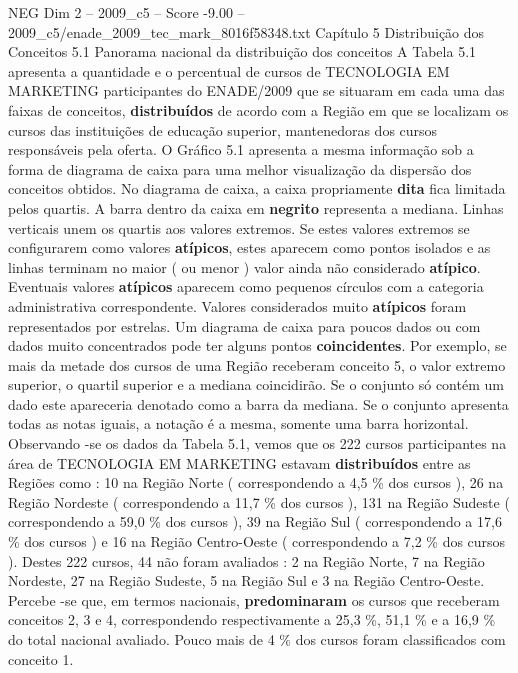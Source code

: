 \begin{textsample}{NEG Dim 2 – 2009\_c5 – Score -9.00 – 2009\_c5/enade\_2009\_tec\_mark\_8016f58348.txt}  \label{ex:f2_neg_001}
Capítulo 5 Distribuição dos Conceitos 5.1 Panorama nacional da distribuição dos conceitos A Tabela 5.1 apresenta a quantidade e o percentual de cursos de TECNOLOGIA EM MARKETING participantes do ENADE/2009 que se situaram em cada uma das faixas de conceitos, \textbf{distribuídos} de acordo com a Região em que se localizam os cursos das instituições de educação superior, mantenedoras dos cursos responsáveis pela oferta.
O Gráfico 5.1 apresenta a mesma informação sob a forma de diagrama de caixa para uma melhor visualização da dispersão dos conceitos obtidos.
No diagrama de caixa, a caixa propriamente \textbf{dita} fica limitada pelos quartis.
A barra dentro da caixa em \textbf{negrito} representa a mediana.
Linhas verticais unem os quartis aos valores extremos.
Se estes valores extremos se configurarem como valores \textbf{atípicos}, estes aparecem como pontos isolados e as linhas terminam no maior ( ou menor ) valor ainda não considerado \textbf{atípico}.
Eventuais valores \textbf{atípicos} aparecem como pequenos círculos com a categoria administrativa correspondente.
Valores considerados muito \textbf{atípicos} foram representados por estrelas.
Um diagrama de caixa para poucos dados ou com dados muito concentrados pode ter alguns pontos \textbf{coincidentes}.
Por exemplo, se mais da metade dos cursos de uma Região receberam conceito 5, o valor extremo superior, o quartil superior e a mediana coincidirão.
Se o conjunto só contém um dado este apareceria denotado como a barra da mediana.
Se o conjunto apresenta todas as notas iguais, a notação é a mesma, somente uma barra horizontal.
Observando -se os dados da Tabela 5.1, vemos que os 222 cursos participantes na área de TECNOLOGIA EM MARKETING estavam \textbf{distribuídos} entre as Regiões como : 10 na Região Norte ( correspondendo a 4,5 \% dos cursos ), 26 na Região Nordeste ( correspondendo a 11,7 \% dos cursos ), 131 na Região Sudeste ( correspondendo a 59,0 \% dos cursos ), 39 na Região Sul ( correspondendo a 17,6 \% dos cursos ) e 16 na Região Centro-Oeste ( correspondendo a 7,2 \% dos cursos ).
Destes 222 cursos, 44 não foram avaliados : 2 na Região Norte, 7 na Região Nordeste, 27 na Região Sudeste, 5 na Região Sul e 3 na Região Centro-Oeste.
Percebe -se que, em termos nacionais, \textbf{predominaram} os cursos que receberam conceitos 2, 3 e 4, correspondendo respectivamente a 25,3 \%, 51,1 \% e a 16,9 \% do total nacional avaliado.
Pouco mais de 4 \% dos cursos foram classificados com conceito 1.

\end{textsample}
